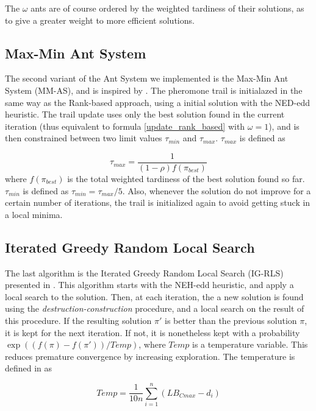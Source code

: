 \documentclass[runningheads]{llncs}
\begin{document}
The $\omega$ ants are of course ordered by the weighted tardiness of their
solutions, as to give a greater weight to more efficient solutions.

\subsection{Max-Min Ant System}

The second variant of the Ant System we implemented is the Max-Min Ant System
(MM-AS), and is inspired by \cite{stutzle1998ant}. The pheromone trail is
initialazed in the same way as the Rank-based approach, using a initial solution
with the NED-edd heuristic. The trail update uses only the best solution found
in the current iteration (thus equivalent to formula \ref{update_rank_based}
with $\omega=1$), and is then constrained between two limit values $\tau_{min}$
and $\tau_{max}$. $\tau_{max}$ is defined as

\begin{equation}
	\tau_{max}=\frac{1}{(1-\rho)f(\pi_{best})}
\end{equation}
where $f(\pi_{best})$ is the total weighted tardiness of the best solution found
so far. $\tau_{min}$ is defined as $\tau_{min}=\tau_{max}/5$. Also, whenever
the solution do not improve for a certain number of iterations, the trail is
initialized again to avoid getting stuck in a local minima.

\subsection{Iterated Greedy Random Local Search}

The last algorithm is the Iterated Greedy Random Local Search (IG-RLS) presented
in \cite{karabulut2016hybrid}. This algorithm starts with the NEH-edd heuristic,
and apply a local search to the solution. Then, at each iteration, the a new
solution is found using the \emph{destruction-construction} procedure, and a
local search on the result of this procedure. If the resulting solution $\pi'$
is better than the previous solution $\pi$, it is kept for the next iteration.
If not, it is nonetheless kept with a probability $\exp((f(\pi) - f(\pi')) /
Temp)$, where $Temp$ is a temperature variable. This reduces premature
convergence by increasing exploration. The temperature is defined in
\cite{karabulut2016hybrid} as

\begin{equation}
	Temp=\frac{1}{10n}\sum_{i=1}^{n}(LB_{Cmax}-d_i)
\end{equation}
\end{document}
